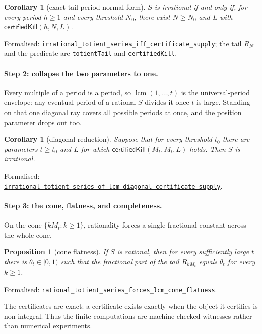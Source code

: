 \documentclass[11pt]{article}
\newcommand{\commit}{81150c1c6fdd4cd51e76d3aa0de344341e0e9e7c}
\newcommand{\repobase}{https://github.com/wcook04/plectis-lean-erdos249-257/blob/\commit}
\newcommand{\PK}{Erdos249257}
\newcommand{\lref}[3]{\href{\repobase/\PK/#1\#L#2}{\nolinkurl{#3}}}
\newcommand{\lrefx}[3]{\href{\repobase/\PK/#1\#L#2}{\nolinkurl{#3}}}
\newtheorem{proposition}[theorem]{Proposition}
\newtheorem{corollary}[theorem]{Corollary}
\theoremstyle{definition}
\theoremstyle{remark}
\newcommand{\lcm}{\operatorname{lcm}}
\begin{document}
\begin{corollary}[exact tail-period normal form]\label{res:red21}
$S$ is irrational if and only if, for every period $h\ge1$ and every threshold
$N_0$, there exist $N\ge N_0$ and $L$ with $\textsf{certifiedKill}(h,N,L)$.
\end{corollary}
\noindent Formalised: \lref{LcmConeFlatness.lean}{412}{irrational_totient_series_iff_certificate_supply};
the tail $R_N$ and the predicate are
\lrefx{TotientTailPeriodKiller.lean}{57}{totientTail} and
\lrefx{TotientTailPeriodKiller.lean}{72}{certifiedKill}.

\paragraph{Step 2: collapse the two parameters to one.} Every multiple of a period
is a period, so $\lcm(1,\dots,t)$ is the universal-period envelope: any eventual
period of a rational $S$ divides it once $t$ is large. Standing on that one
diagonal ray covers all possible periods at once, and the position parameter
drops out too.

\begin{corollary}[diagonal reduction]\label{res:diag}
Suppose that for every threshold $t_0$ there are parameters $t\ge t_0$ and
$L$ for which $\textsf{certifiedKill}(M_t,M_t,L)$ holds. Then $S$ is
irrational.
\end{corollary}
\noindent Formalised: \lref{LcmDiagonalReduction.lean}{112}{irrational_totient_series_of_lcm_diagonal_certificate_supply}.

\paragraph{Step 3: the cone, flatness, and completeness.} On the cone
$\{kM_t:k\ge1\}$, rationality forces a single fractional constant across the
whole cone.

\begin{proposition}[cone flatness]\label{res:flat}
If $S$ is rational, then for every sufficiently large $t$ there is
$\theta_t\in[0,1)$ such that the fractional part of the tail $R_{kM_t}$ equals
$\theta_t$ for every $k\ge1$.
\end{proposition}
\noindent Formalised: \lref{LcmConeFlatness.lean}{90}{rational_totient_series_forces_lcm_cone_flatness}.

The certificates are exact: a certificate exists exactly
when the object it certifies is non-integral. Thus the finite computations are
machine-checked witnesses rather than numerical experiments.
\end{document}
